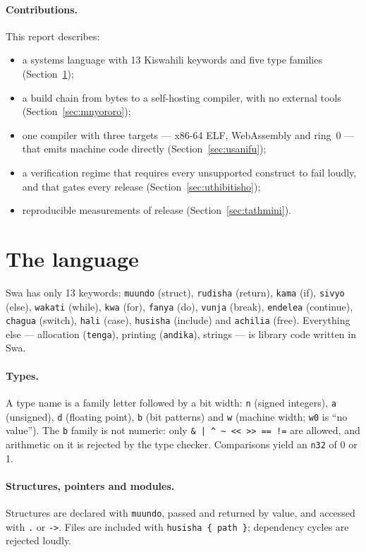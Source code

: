\documentclass[11pt,a4paper]{article}
\begin{document}
\paragraph{Contributions.} This report describes:
\begin{itemize}
  \item a systems language with 13 Kiswahili keywords and five type families (Section~\ref{sec:lugha});
  \item a build chain from \KwanzaBaiti{} bytes to a self-hosting compiler, with no external tools (Section~\ref{sec:mnyororo});
  \item one compiler with three targets --- x86-64 ELF, WebAssembly and ring~0 --- that emits machine code directly (Section~\ref{sec:usanifu});
  \item a verification regime that requires every unsupported construct to fail loudly, and that gates every release (Section~\ref{sec:uthibitisho});
  \item reproducible measurements of release \Toleo{} (Section~\ref{sec:tathmini}).
\end{itemize}

\section{The language}\label{sec:lugha}

Swa has only 13 keywords: \texttt{muundo} (struct), \texttt{rudisha} (return), \texttt{kama} (if), \texttt{sivyo} (else), \texttt{wakati} (while), \texttt{kwa} (for), \texttt{fanya} (do), \texttt{vunja} (break), \texttt{endelea} (continue), \texttt{chagua} (switch), \texttt{hali} (case), \texttt{husisha} (include) and \texttt{achilia} (free). Everything else --- allocation (\texttt{tenga}), printing (\texttt{andika}), strings --- is library code written in Swa.

\paragraph{Types.} A type name is a family letter followed by a bit width: \texttt{n} (signed integers), \texttt{a} (unsigned), \texttt{d} (floating point), \texttt{b} (bit patterns) and \texttt{w} (machine width; \texttt{w0} is ``no value''). The \texttt{b} family is not numeric: only \texttt{\& | \^{} \textasciitilde{} << >> == !=} are allowed, and arithmetic on it is rejected by the type checker. Comparisons yield an \texttt{n32} of 0 or 1.

\paragraph{Structures, pointers and modules.} Structures are declared with \texttt{muundo}, passed and returned by value, and accessed with \texttt{.} or \texttt{->}. Files are included with \texttt{husisha \{ path \}}; dependency cycles are rejected loudly.
\end{document}

